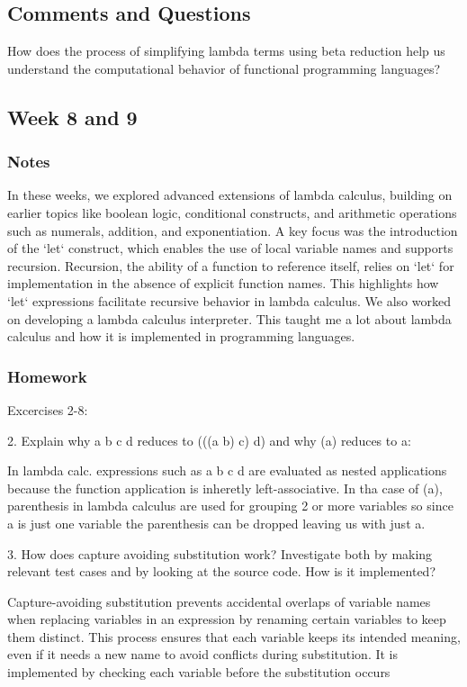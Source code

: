 \documentclass{article}
\theoremstyle{theorem}
\theoremstyle{definition}
\theoremstyle{remark}
\begin{document}
\subsection*{Comments and Questions}
How does the process of simplifying lambda terms using beta reduction help us understand the computational behavior of functional programming languages?

\subsection{Week 8 and 9}

\subsubsection*{Notes}
In these weeks, we explored advanced extensions of lambda calculus, building on earlier topics like boolean logic, conditional constructs, and arithmetic operations such as numerals, addition, and exponentiation. A key focus was the introduction of the `let` construct, which enables the use of local variable names and supports recursion. Recursion, the ability of a function to reference itself, relies on `let` for implementation in the absence of explicit function names. This highlights how `let` expressions facilitate recursive behavior in lambda calculus. We also worked on developing a lambda calculus interpreter. This taught me a lot about lambda calculus and how it is implemented in programming languages.

\subsubsection*{Homework}
Excercises 2-8:

2. Explain why a b c d reduces to (((a b) c) d) and why (a) reduces to a:

In lambda calc. expressions such as a b c d are evaluated as nested applications because the function application is inheretly left-associative. In tha case of (a), parenthesis in lambda calculus are used for grouping 2 or more variables so since a is just one variable the parenthesis can be dropped leaving us with just a.

3. How does capture avoiding substitution work? Investigate both by making relevant test cases and by looking at the source code. How is it implemented?

Capture-avoiding substitution prevents accidental overlaps of variable names when replacing variables in an expression by renaming certain variables to keep them distinct. This process ensures that each variable keeps its intended meaning, even if it needs a new name to avoid conflicts during substitution. It is implemented by checking each variable before the substitution occurs
\end{document}
